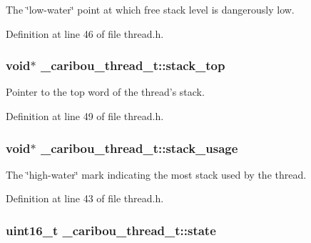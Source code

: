The \char`\"{}low-\/water\char`\"{} point at which free stack level is dangerously low. 



Definition at line 46 of file thread.\-h.

\hypertarget{struct__caribou__thread__t_a82a114a6b3fb2c733159562ba9442eca}{
\subsubsection[{stack\-\_\-top}]{\setlength{\rightskip}{0pt plus 5cm}void$\ast$ \-\_\-caribou\-\_\-thread\-\_\-t\-::stack\-\_\-top}}\label{struct__caribou__thread__t_a82a114a6b3fb2c733159562ba9442eca}


Pointer to the top word of the thread's stack. 



Definition at line 49 of file thread.\-h.

\hypertarget{struct__caribou__thread__t_af4ac7e484b60887e54aeff966cf366da}{
\subsubsection[{stack\-\_\-usage}]{\setlength{\rightskip}{0pt plus 5cm}void$\ast$ \-\_\-caribou\-\_\-thread\-\_\-t\-::stack\-\_\-usage}}\label{struct__caribou__thread__t_af4ac7e484b60887e54aeff966cf366da}


The \char`\"{}high-\/water\char`\"{} mark indicating the most stack used by the thread. 



Definition at line 43 of file thread.\-h.

\hypertarget{struct__caribou__thread__t_a9896ce34d6cb9832eca2456d281b2eec}{
\subsubsection[{state}]{\setlength{\rightskip}{0pt plus 5cm}uint16\-\_\-t \-\_\-caribou\-\_\-thread\-\_\-t\-::state}}\label{struct__caribou__thread__t_a9896ce34d6cb9832eca2456d281b2eec}


